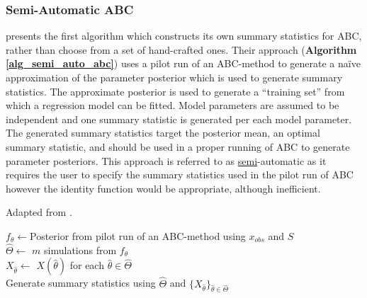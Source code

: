 \documentclass[11pt,a4paper]{article}
\theoremstyle{break}
\begin{document}
\subsubsection{Semi-Automatic ABC}\label{sec_semi_automatic_abc}
  \cite[]{constructing_summary_statistics_for_approximate_bayesian_computation_semi_automatic_ABC} presents the first algorithm which constructs its own summary statistics for ABC, rather than choose from a set of hand-crafted ones. Their approach (\textbf{Algorithm \ref{alg_semi_auto_abc}}) uses a pilot run of an ABC-method to generate a na\"ive approximation of the parameter posterior which is used to generate summary statistics. The approximate posterior is used to generate a ``training set'' from which a regression model can be fitted. Model parameters are assumed to be independent and one summary statistic is generated per each model parameter. The generated summary statistics target the posterior mean, an optimal summary statistic, and should be used in a proper running of ABC to generate parameter posteriors. This approach is referred to as \underline{semi}-automatic as it requires the user to specify the summary statistics used in the pilot run of ABC however the identity function would be appropriate, although inefficient.

  \begin{box_algorithm}\label{alg_semi_auto_abc}
    Adapted from \cite[]{constructing_summary_statistics_for_approximate_bayesian_computation_semi_automatic_ABC}.
    \begin{algorithm}[H]
      $f_\theta\leftarrow$Posterior from pilot run of an ABC-method using $x_{obs}$ and $S$\label{alg_semi_auto_abc_pilot_run}\\
      $\hat\Theta\leftarrow$ $m$ simulations from $f_\theta$\\
      $X_{\hat\theta}\leftarrow$ $X\left(\hat\theta\right)$ for each $\hat\theta\in\hat\Theta$\\
      Generate summary statistics using $\hat\Theta$ and $\{X_{\hat\theta}\}_{\hat\theta\in\hat\Theta}$\label{alg_semi_auto_abc_estimate_ss}
    \end{algorithm}
  \end{box_algorithm}
\end{document}
